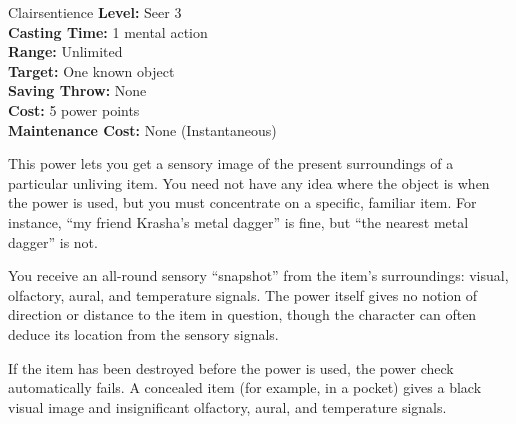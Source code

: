 {Clairsentience}
{
	\textbf{Level:}
	Seer 3\\
	\textbf{Casting Time:}
	1 mental action\\
	\textbf{Range:}
	Unlimited\\
	\textbf{Target:}
	One known object\\
	\textbf{Saving Throw:}
	None\\
	\textbf{Cost:}
	5 power points\\
	\textbf{Maintenance Cost:}
	None (Instantaneous)\\
}
{
	This power lets you get a sensory image of the present surroundings of a particular unliving item. You need not have any idea where the object is when the power is used, but you must concentrate on a specific, familiar item. For instance, ``my friend Krasha's metal dagger'' is fine, but ``the nearest metal dagger'' is not.

	You receive an all-round sensory ``snapshot'' from the item's surroundings: visual, olfactory, aural, and temperature signals. The power itself gives no notion of direction or distance to the item in question, though the character can often deduce its location from the sensory signals.

	If the item has been destroyed before the power is used, the power check automatically fails. A concealed item (for example, in a pocket) gives a black visual image and insignificant olfactory, aural, and temperature signals.
}